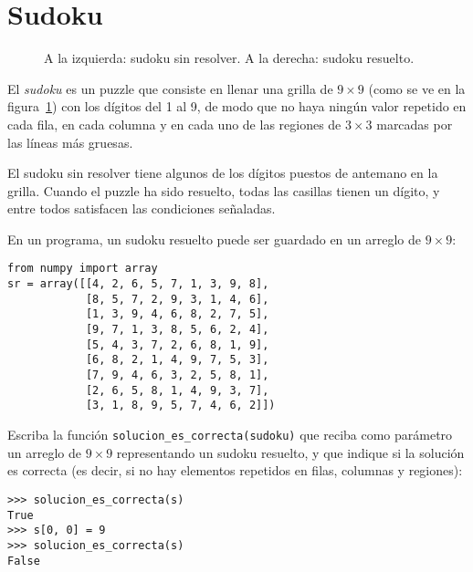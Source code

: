 \section{Sudoku}

\begin{figure}
  \centering
  
  \caption{%
    A la izquierda: sudoku sin resolver.
    A la derecha: sudoku resuelto.
  }
  \label{fig:sudoku}
\end{figure}

El \emph{sudoku} es un puzzle que consiste en llenar
una grilla de \(9 × 9\)
(como se ve en la figura~\ref{fig:sudoku})
con los dígitos del 1 al 9,
de modo que no haya ningún valor repetido en
cada fila, en cada columna y en cada uno de las regiones de \(3 × 3\)
marcadas por las líneas más gruesas.

El sudoku sin resolver tiene algunos de los dígitos puestos de antemano
en la grilla. Cuando el puzzle ha sido resuelto, todas las casillas
tienen un dígito, y entre todos satisfacen las condiciones señaladas.

En un programa, un sudoku resuelto puede ser guardado en un arreglo de
\(9 × 9\):

\begin{lstlisting}
from numpy import array
sr = array([[4, 2, 6, 5, 7, 1, 3, 9, 8],
            [8, 5, 7, 2, 9, 3, 1, 4, 6],
            [1, 3, 9, 4, 6, 8, 2, 7, 5],
            [9, 7, 1, 3, 8, 5, 6, 2, 4],
            [5, 4, 3, 7, 2, 6, 8, 1, 9],
            [6, 8, 2, 1, 4, 9, 7, 5, 3],
            [7, 9, 4, 6, 3, 2, 5, 8, 1],
            [2, 6, 5, 8, 1, 4, 9, 3, 7],
            [3, 1, 8, 9, 5, 7, 4, 6, 2]])
\end{lstlisting}

Escriba la función \lstinline!solucion_es_correcta(sudoku)! que reciba
como parámetro un arreglo de \(9 × 9\) representando un sudoku resuelto, y
que indique si la solución es correcta (es decir, si no hay elementos
repetidos en filas, columnas y regiones):

\begin{lstlisting}
>>> solucion_es_correcta(s)
True
>>> s[0, 0] = 9
>>> solucion_es_correcta(s)
False
\end{lstlisting}

